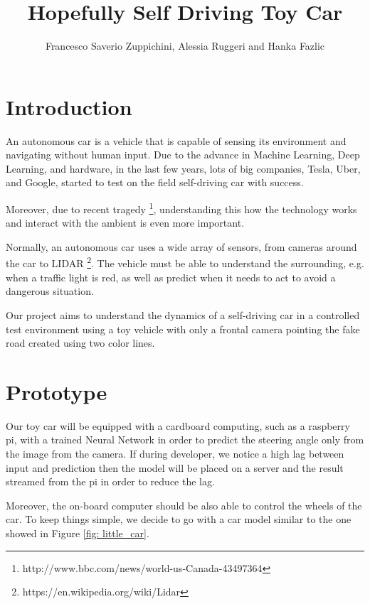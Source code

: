 \documentclass[11pt]{article}
\title{Hopefully Self Driving Toy Car}
\author{Francesco Saverio Zuppichini, Alessia Ruggeri and Hanka Fazlic}
\begin{document}
\maketitle
\section{Introduction}
An autonomous car is a vehicle that is capable of sensing its environment and navigating without human input. Due to the advance in Machine Learning, Deep Learning, and hardware, in the last few years, lots of big companies, Tesla, Uber, and Google, started to test on the field self-driving car with success. 

Moreover, due to recent tragedy \footnote{http://www.bbc.com/news/world-us-Canada-43497364}, understanding this how the technology works and interact with the ambient is even more important. 

Normally, an autonomous car uses a wide array of sensors, from cameras around the car to LIDAR \footnote{https://en.wikipedia.org/wiki/Lidar}. The vehicle must be able to understand the surrounding, e.g. when a traffic light is red, as well as predict when it needs to act to avoid a dangerous situation. 

Our project aims to understand the dynamics of a self-driving car in a controlled test environment using a toy vehicle with only a frontal camera pointing the fake road created using two color lines. 

\section{Prototype}
Our toy car will be equipped with a cardboard computing, such as a raspberry pi, with a trained Neural Network in order to predict the steering angle only from the image from the camera. If during developer, we notice a high lag between input and prediction then the model will be placed on a server and the result streamed from the pi in order to reduce the lag.

Moreover, the on-board computer should be also able to control the wheels of the car. To keep things simple, we decide to go with a car model similar to the one showed in Figure \ref{fig: little_car}.
\end{document}

